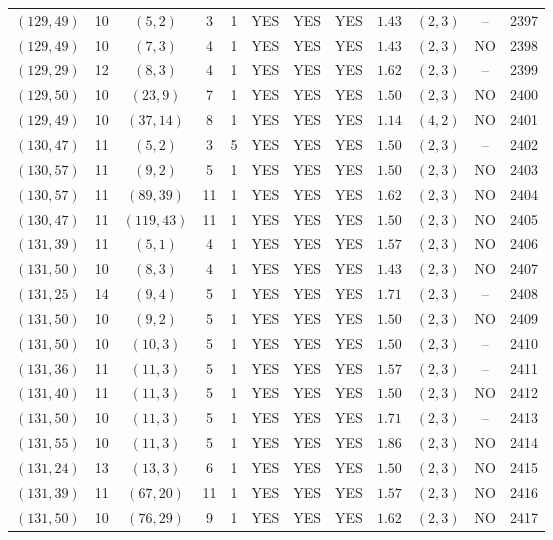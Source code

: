 \begin{longtable}{|c|c|c|c|c|c|c|c|c|c|c|c|}
$(129,49)$ & 10 & $(5,2)$ & 3 & 1 & YES & YES & YES & $1.43$ & $(2,3)$ & -- & 2397\\
$(129,49)$ & 10 & $(7,3)$ & 4 & 1 & YES & YES & YES & $1.43$ & $(2,3)$ & NO & 2398\\
$(129,29)$ & 12 & $(8,3)$ & 4 & 1 & YES & YES & YES & $1.62$ & $(2,3)$ & -- & 2399\\
$(129,50)$ & 10 & $(23,9)$ & 7 & 1 & YES & YES & YES & $1.50$ & $(2,3)$ & NO & 2400\\
$(129,49)$ & 10 & $(37,14)$ & 8 & 1 & YES & YES & YES & $1.14$ & $(4,2)$ & NO & 2401\\
$(130,47)$ & 11 & $(5,2)$ & 3 & 5 & YES & YES & YES & $1.50$ & $(2,3)$ & -- & 2402\\
$(130,57)$ & 11 & $(9,2)$ & 5 & 1 & YES & YES & YES & $1.50$ & $(2,3)$ & NO & 2403\\
$(130,57)$ & 11 & $(89,39)$ & 11 & 1 & YES & YES & YES & $1.62$ & $(2,3)$ & NO & 2404\\
$(130,47)$ & 11 & $(119,43)$ & 11 & 1 & YES & YES & YES & $1.50$ & $(2,3)$ & NO & 2405\\
$(131,39)$ & 11 & $(5,1)$ & 4 & 1 & YES & YES & YES & $1.57$ & $(2,3)$ & NO & 2406\\
$(131,50)$ & 10 & $(8,3)$ & 4 & 1 & YES & YES & YES & $1.43$ & $(2,3)$ & NO & 2407\\
$(131,25)$ & 14 & $(9,4)$ & 5 & 1 & YES & YES & YES & $1.71$ & $(2,3)$ & -- & 2408\\
$(131,50)$ & 10 & $(9,2)$ & 5 & 1 & YES & YES & YES & $1.50$ & $(2,3)$ & NO & 2409\\
$(131,50)$ & 10 & $(10,3)$ & 5 & 1 & YES & YES & YES & $1.50$ & $(2,3)$ & -- & 2410\\
$(131,36)$ & 11 & $(11,3)$ & 5 & 1 & YES & YES & YES & $1.57$ & $(2,3)$ & -- & 2411\\
$(131,40)$ & 11 & $(11,3)$ & 5 & 1 & YES & YES & YES & $1.50$ & $(2,3)$ & NO & 2412\\
$(131,50)$ & 10 & $(11,3)$ & 5 & 1 & YES & YES & YES & $1.71$ & $(2,3)$ & -- & 2413\\
$(131,55)$ & 10 & $(11,3)$ & 5 & 1 & YES & YES & YES & $1.86$ & $(2,3)$ & NO & 2414\\
$(131,24)$ & 13 & $(13,3)$ & 6 & 1 & YES & YES & YES & $1.50$ & $(2,3)$ & NO & 2415\\
$(131,39)$ & 11 & $(67,20)$ & 11 & 1 & YES & YES & YES & $1.57$ & $(2,3)$ & NO & 2416\\
$(131,50)$ & 10 & $(76,29)$ & 9 & 1 & YES & YES & YES & $1.62$ & $(2,3)$ & NO & 2417\\

\end{longtable}
